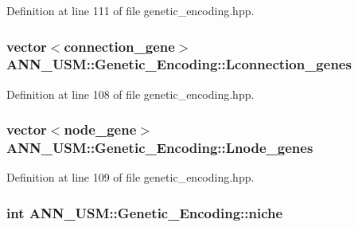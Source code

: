 Definition at line 111 of file genetic\-\_\-encoding.\-hpp.

\hypertarget{class_a_n_n___u_s_m_1_1_genetic___encoding_a4396b8b09edcd7be7714cebf1df17742}{
\subsubsection[{Lconnection\-\_\-genes}]{\setlength{\rightskip}{0pt plus 5cm}vector$<${\bf connection\-\_\-gene}$>$ A\-N\-N\-\_\-\-U\-S\-M\-::\-Genetic\-\_\-\-Encoding\-::\-Lconnection\-\_\-genes}}\label{class_a_n_n___u_s_m_1_1_genetic___encoding_a4396b8b09edcd7be7714cebf1df17742}


Definition at line 108 of file genetic\-\_\-encoding.\-hpp.

\hypertarget{class_a_n_n___u_s_m_1_1_genetic___encoding_a2afdafa9f3c396f1ffeee7c0c4a2269e}{
\subsubsection[{Lnode\-\_\-genes}]{\setlength{\rightskip}{0pt plus 5cm}vector$<${\bf node\-\_\-gene}$>$ A\-N\-N\-\_\-\-U\-S\-M\-::\-Genetic\-\_\-\-Encoding\-::\-Lnode\-\_\-genes}}\label{class_a_n_n___u_s_m_1_1_genetic___encoding_a2afdafa9f3c396f1ffeee7c0c4a2269e}


Definition at line 109 of file genetic\-\_\-encoding.\-hpp.

\hypertarget{class_a_n_n___u_s_m_1_1_genetic___encoding_ab7d9c478bd171ad0e522298c42fe6ba9}{
\subsubsection[{niche}]{\setlength{\rightskip}{0pt plus 5cm}int A\-N\-N\-\_\-\-U\-S\-M\-::\-Genetic\-\_\-\-Encoding\-::niche}}\label{class_a_n_n___u_s_m_1_1_genetic___encoding_ab7d9c478bd171ad0e522298c42fe6ba9}


